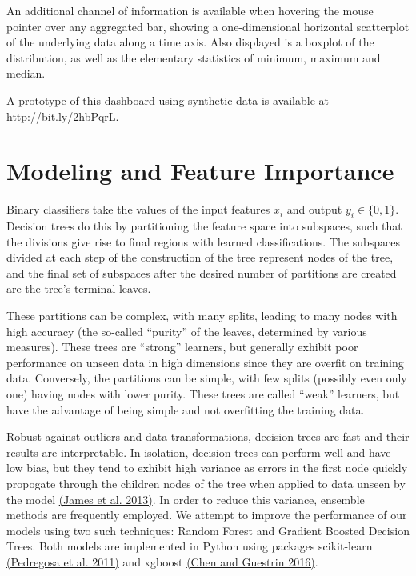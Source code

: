 \documentclass{AISB2008}
\begin{document}
An additional channel of information is available when hovering the mouse pointer over any aggregated bar, showing a one-dimensional horizontal scatterplot of the underlying data along a time axis. Also displayed is a boxplot of the distribution, as well as the elementary statistics of minimum, maximum and median.

A prototype of this dashboard using synthetic data is available at \href{http://bit.ly/2hbPqrL}{http://bit.ly/2hbPqrL}.

\section{Modeling and Feature Importance}

Binary classifiers take the values of the input features $x_{i}$ and output $y_{i} \in \{0,1\}$. Decision trees do this by partitioning the feature space into subspaces, such that the divisions give rise to final regions with learned classifications. The subspaces divided at each step of the construction of the tree represent nodes of the tree, and the final set of subspaces after the desired number of partitions are created are the tree's terminal leaves.

These partitions can be complex, with many splits, leading to many nodes with high accuracy (the so-called ``purity'' of the leaves, determined by various measures). These trees are ``strong'' learners, but generally exhibit poor performance on unseen data in high dimensions since they are overfit on training data. Conversely, the partitions can be simple, with few splits (possibly even only one) having nodes with lower purity. These trees are called ``weak'' learners, but have the advantage of being simple and not overfitting the training data.

Robust against outliers and data transformations, decision trees are fast and their results are interpretable. In isolation, decision trees can perform well and have low bias, but they tend to exhibit high variance as errors in the first node quickly propogate through the children nodes of the tree when applied to data unseen by the model \hyperref[csl:4]{(James et al. 2013)}. In order to reduce this variance, ensemble methods are frequently employed. We attempt to improve the performance of our models using two such techniques: Random Forest and Gradient Boosted Decision Trees. Both models are implemented in Python using packages scikit-learn \hyperref[csl:5]{(Pedregosa et al. 2011)} and xgboost \hyperref[csl:6]{(Chen and Guestrin 2016)}.
\end{document}
